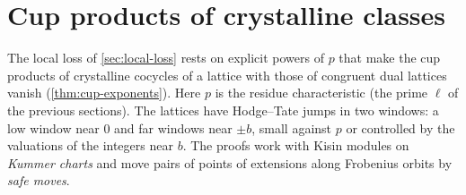 \section{Cup products of crystalline classes}\label{sec:crystalline}

The local loss of \cref{sec:local-loss} rests on explicit powers of $p$ that make the cup products of crystalline cocycles of a lattice with those of congruent dual lattices
vanish (\cref{thm:cup-exponents}). Here $p$ is the residue characteristic (the prime $\ell$ of the previous sections). The lattices have Hodge--Tate jumps in two windows:
a low window near $0$ and far windows near $\pm b$, small against $p$ or controlled by the valuations of the integers near $b$. The proofs work with Kisin modules on
\emph{Kummer charts} and move pairs of points of extensions along Frobenius orbits by \emph{safe moves}.


